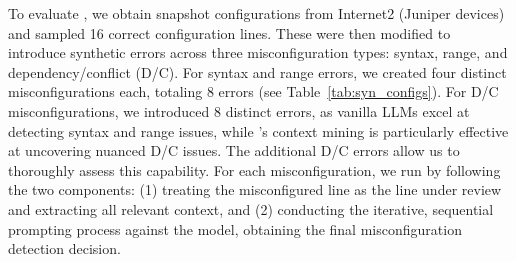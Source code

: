 




To evaluate \sysname{}, we obtain snapshot configurations from Internet2 (Juniper devices) and sampled 16 correct configuration lines. These were then modified to introduce synthetic errors across three misconfiguration types: syntax, range, and dependency/conflict (D/C). For syntax and range errors, we created four distinct misconfigurations each, totaling 8 errors (see Table~\ref{tab:syn_configs}). For D/C misconfigurations, we introduced 8 distinct errors, as vanilla LLMs excel at detecting syntax and range issues, while \sysname{}’s context mining is particularly effective at uncovering nuanced D/C issues. The additional D/C errors allow us to thoroughly assess this capability.
For each misconfiguration, we run \sysname{} by following the two components: (1) treating the misconfigured line as the line under review and extracting all relevant context, and (2) conducting the iterative, sequential prompting process against the model, obtaining the final misconfiguration detection decision.


